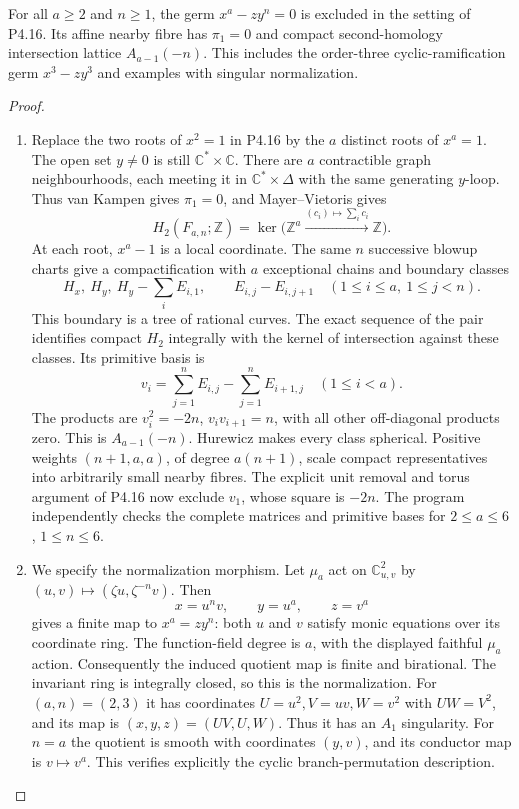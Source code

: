 \begin{proposition}[P4.17]\hypertarget{tag-02WO}{}\label{night:P4.17}\label{stmt:P4.17}

For all $a\geq2$ and $n\geq1$, the germ $x^a-zy^n=0$ is
excluded in the setting of P4.16. Its affine nearby fibre has
$\pi_1=0$ and compact second-homology intersection lattice
$A_{a-1}(-n)$. This includes the order-three cyclic-ramification
germ $x^3-zy^3$ and examples with singular normalization.
\end{proposition}
\begin{proof}

\begin{enumerate}[label={$\langle1\rangle$\arabic*.},leftmargin=*]
\item Replace the two roots of $x^2=1$ in P4.16 by the $a$ distinct
roots of $x^a=1$. The open set $y\ne0$ is still
$\mathbb C^*\times\mathbb C$. There are $a$ contractible graph
neighbourhoods, each meeting it in $\mathbb C^*\times\Delta$
with the same generating $y$-loop. Thus van Kampen gives
$\pi_1=0$, and Mayer--Vietoris gives
\[
 H_2(F_{a,n};\mathbb Z)=\ker\bigl(\mathbb Z^a
   \xrightarrow{(c_i)\mapsto\sum_i c_i}\mathbb Z\bigr).
\]
At each root, $x^a-1$ is a local coordinate. The same $n$
successive blowup charts give a compactification with $a$
exceptional chains and boundary classes
\[
 H_x,\ H_y,\ H_y-\sum_i E_{i,1},\qquad
 E_{i,j}-E_{i,j+1}\quad(1\leq i\leq a,\ 1\leq j<n).
\]
This boundary is a tree of rational curves. The exact sequence
of the pair identifies compact $H_2$ integrally with the kernel
of intersection against these classes. Its primitive basis is
\[
 v_i=\sum_{j=1}^n E_{i,j}-\sum_{j=1}^n E_{i+1,j}
       \quad(1\leq i<a).
\]
The products are $v_i^2=-2n$, $v_iv_{i+1}=n$, with all other
off-diagonal products zero. This is $A_{a-1}(-n)$.
Hurewicz makes every class spherical. Positive weights
$(n+1,a,a)$, of degree $a(n+1)$, scale compact representatives
into arbitrarily small nearby fibres. The explicit unit removal
and torus argument of P4.16 now exclude $v_1$, whose square
is $-2n$. The program independently checks the complete
matrices and primitive bases for $2\leq a\leq6$, $1\leq n\leq6$.

\item We specify the normalization morphism. Let $\mu_a$ act on
$\mathbb C^2_{u,v}$ by $(u,v)\mapsto(\zeta u,\zeta^{-n}v)$.
Then
\[
 x=u^nv,\qquad y=u^a,\qquad z=v^a
\]
gives a finite map to $x^a=zy^n$: both $u$ and $v$ satisfy
monic equations over its coordinate ring. The function-field
degree is $a$, with the displayed faithful $\mu_a$ action.
Consequently the induced quotient map is finite and birational.
The invariant ring is integrally closed, so this is the
normalization. For $(a,n)=(2,3)$ it has coordinates
$U=u^2,V=uv,W=v^2$ with $UW=V^2$, and its map is
$(x,y,z)=(UV,U,W)$. Thus it has an $A_1$ singularity.
For $n=a$ the quotient is smooth with coordinates $(y,v)$,
and its conductor map is $v\mapsto v^a$. This verifies
explicitly the cyclic branch-permutation description.

\end{enumerate}
\end{proof}